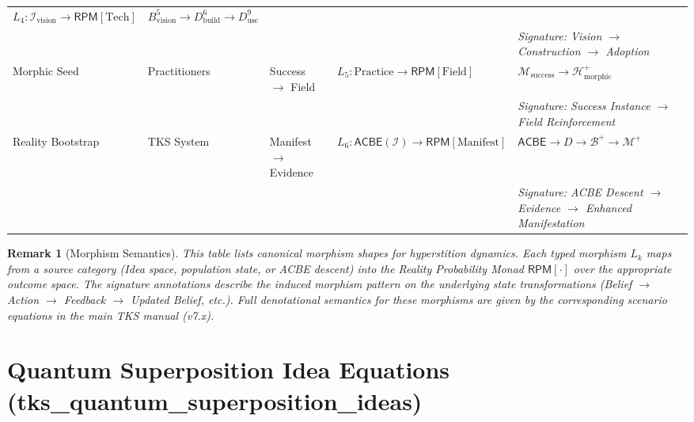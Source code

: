 \documentclass[11pt,twoside]{book}
\newcommand{\Ideas}{\mathcal{I}}
\newcommand{\RPM}{\mathsf{RPM}}
\newcommand{\ACBE}{\mathsf{ACBE}}
\newcommand{\Hyperstition}{\mathcal{H}}
\newtheorem{remark}{Remark}[chapter]
\begin{document}
\begin{center}
\begin{longtable}{p{1.6cm}|p{1.6cm}|p{1.8cm}|p{3.2cm}|p{3.8cm}}
$L_4 : \Ideas_{\mathrm{vision}} \to \RPM[\mathrm{Tech}]$ &
$B^5_{\mathrm{vision}} \to D^6_{\mathrm{build}} \to D^9_{\mathrm{use}}$ \\
& & & & \textit{Signature: Vision $\to$ Construction $\to$ Adoption} \\
\midrule
Morphic Seed & Practitioners & Success $\to$ Field &
$L_5 : \mathrm{Practice} \to \RPM[\mathrm{Field}]$ &
$\mathcal{M}_{\mathrm{success}} \to \Hyperstition_{\mathrm{morphic}}^+$ \\
& & & & \textit{Signature: Success Instance $\to$ Field Reinforcement} \\
\midrule
Reality Bootstrap & TKS System & Manifest $\to$ Evidence &
$L_6 : \ACBE(\Ideas) \to \RPM[\mathrm{Manifest}]$ &
$\ACBE \to D \to \mathcal{B}^+ \to \mathcal{M}^+$ \\
& & & & \textit{Signature: ACBE Descent $\to$ Evidence $\to$ Enhanced Manifestation} \\
\end{longtable}
\end{center}

\begin{remark}[Morphism Semantics]
This table lists canonical morphism shapes for hyperstition dynamics. Each typed morphism
$L_k$ maps from a source category (Idea space, population state, or ACBE descent) into
the Reality Probability Monad $\RPM[\cdot]$ over the appropriate outcome space. The
signature annotations describe the induced morphism pattern on the underlying state
transformations (Belief $\to$ Action $\to$ Feedback $\to$ Updated Belief, etc.).
Full denotational semantics for these morphisms are given by the corresponding
scenario equations in the main TKS manual (v7.x).
\end{remark}

\chapter{Quantum Superposition Idea Equations (tks\_quantum\_superposition\_ideas)}
\label{ch:quantum-superposition}
\end{document}
